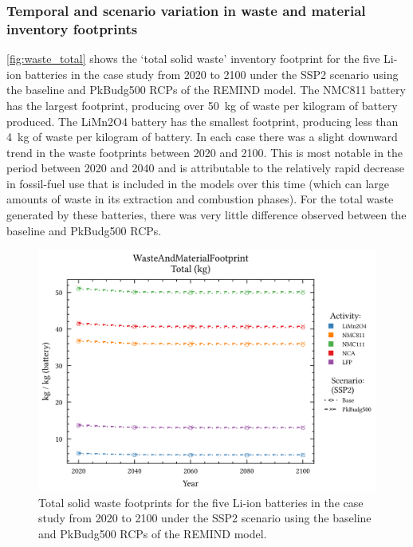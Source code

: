 


\subsubsection{Temporal and scenario variation in waste and material inventory footprints}\label{sec:results-case_study-total_footprints}

\autoref{fig:waste_total} shows the `total solid waste' inventory footprint for the five Li-ion batteries in the case study from 2020 to 2100 under the SSP2 scenario using the baseline and PkBudg500 RCPs of the REMIND model. The NMC811 battery has the largest footprint, producing over 50~kg of waste per kilogram of battery produced. The LiMn2O4 battery has the smallest footprint, producing less than 4~kg of waste per kilogram of battery. In each case there was a slight downward trend in the waste footprints between 2020 and 2100. This is most notable in the period between 2020 and 2040 and is attributable to the relatively rapid decrease in fossil-fuel use that is included in the models over this time (which can large amounts of waste in its extraction and combustion phases). For the total waste generated by these batteries, there was very little difference observed between the baseline and PkBudg500 RCPs.

\begin{figure}[H]
    \centering
    \includegraphics[width=0.7\linewidth]{figures/total_waste.png}
    \caption{Total solid waste footprints for the five Li-ion batteries in the case study from 2020 to 2100 under the SSP2 scenario using the baseline and PkBudg500 RCPs of the REMIND model.}\label{fig:waste_total}
\end{figure}

